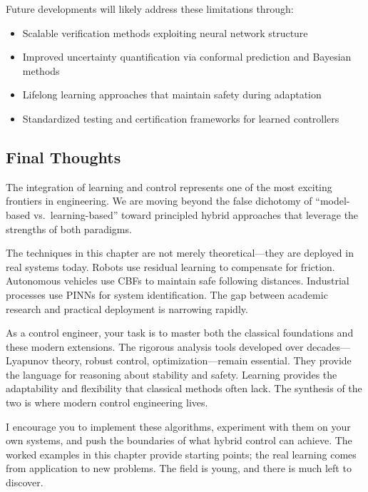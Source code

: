 Future developments will likely address these limitations through:
\begin{itemize}
    \item Scalable verification methods exploiting neural network structure
    \item Improved uncertainty quantification via conformal prediction and Bayesian methods
    \item Lifelong learning approaches that maintain safety during adaptation
    \item Standardized testing and certification frameworks for learned controllers
\end{itemize}

\subsection{Final Thoughts}

The integration of learning and control represents one of the most exciting frontiers in engineering. We are moving beyond the false dichotomy of ``model-based vs.\ learning-based'' toward principled hybrid approaches that leverage the strengths of both paradigms.

The techniques in this chapter are not merely theoretical---they are deployed in real systems today. Robots use residual learning to compensate for friction. Autonomous vehicles use CBFs to maintain safe following distances. Industrial processes use PINNs for system identification. The gap between academic research and practical deployment is narrowing rapidly.

As a control engineer, your task is to master both the classical foundations and these modern extensions. The rigorous analysis tools developed over decades---Lyapunov theory, robust control, optimization---remain essential. They provide the language for reasoning about stability and safety. Learning provides the adaptability and flexibility that classical methods often lack. The synthesis of the two is where modern control engineering lives.

I encourage you to implement these algorithms, experiment with them on your own systems, and push the boundaries of what hybrid control can achieve. The worked examples in this chapter provide starting points; the real learning comes from application to new problems. The field is young, and there is much left to discover.


